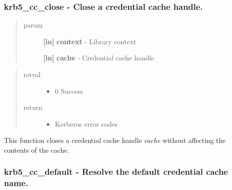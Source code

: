 \documentclass[letterpaper,10pt,english]{sphinxmanual}
\begin{document}
\subsubsection{krb5\_cc\_close -  Close a credential cache handle.}
\label{appdev/refs/api/krb5_cc_close:krb5-cc-close-close-a-credential-cache-handle}\label{appdev/refs/api/krb5_cc_close::doc}

\begin{fulllineitems}
\label{appdev/refs/api/krb5_cc_close:c.krb5_cc_close}
\end{fulllineitems}

\begin{quote}\begin{description}
\item[{param}] \leavevmode
\textbf{{[}in{]}} \textbf{context} - Library context

\textbf{{[}in{]}} \textbf{cache} - Credential cache handle

\end{description}\end{quote}
\begin{quote}\begin{description}
\item[{retval}] \leavevmode\begin{itemize}
\item {} 
0   Success

\end{itemize}

\item[{return}] \leavevmode\begin{itemize}
\item {} 
Kerberos error codes

\end{itemize}

\end{description}\end{quote}

This function closes a credential cache handle \emph{cache} without affecting the contents of the cache.


\subsubsection{krb5\_cc\_default -  Resolve the default credential cache name.}
\label{appdev/refs/api/krb5_cc_default::doc}\label{appdev/refs/api/krb5_cc_default:krb5-cc-default-resolve-the-default-credential-cache-name}
\end{document}
